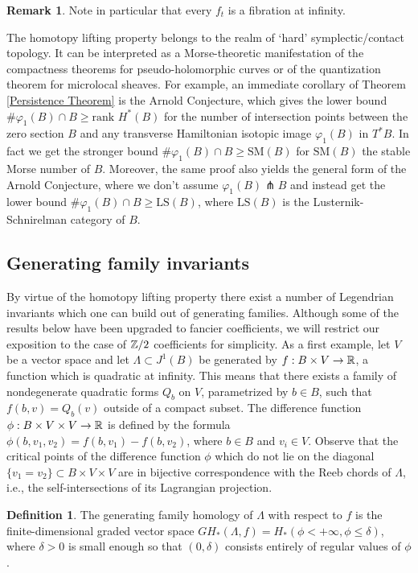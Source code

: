 \documentclass[11pt]{article}
\newcommand{\ie}{i.e.,\xspace}
\numberwithin{equation}{section}\providecommand{\dpl}{\displaystyle}
\theoremstyle{plain}
\theoremstyle{definition}
\newtheorem{definition}[theorem]{Definition}
\newtheorem{remark}[theorem]{Remark}
\begin{document}
\begin{remark} Note in particular that every $f_t$ is a fibration at infinity. \end{remark}

The homotopy lifting property belongs to the realm of `hard' symplectic/contact topology. It can be interpreted as a Morse-theoretic manifestation of the compactness theorems for pseudo-holomorphic curves or of the quantization theorem for microlocal sheaves. For example, an immediate corollary of Theorem \ref{Persistence Theorem} is the Arnold Conjecture, which gives the lower bound $\# \varphi_1(B) \cap B\geq \text{rank }H^*(B)$ for the number of intersection points between the zero section $B$ and any transverse Hamiltonian isotopic image $\varphi_1(B)$ in $T^*B$. In fact we get the stronger bound $\# \varphi_1(B) \cap B\geq \text{SM}(B)$ for $\text{SM}(B)$ the stable Morse number of $B$. Moreover, the same proof also yields the general form of the Arnold Conjecture, where we don't assume $\varphi_1(B) \pitchfork B$ and instead get the lower bound $\# \varphi_1(B) \cap B \geq \text{LS}(B)$, where $\text{LS}(B)$ is the Lusternik-Schnirelman category of $B$.

\subsection{Generating family invariants}

By virtue of the homotopy lifting property there exist a number of Legendrian invariants which one can build out of generating families. Although some of the results below have been upgraded to fancier coefficients, we will restrict our exposition to the case of $\mathbb{Z}/2$ coefficients for simplicity. As a first example, let $V$ be a vector space and let $\Lambda \subset J^1(B)$ be generated by $f:B \times V \to \mathbb{R}$, a function which is quadratic at infinity. This means that there exists a family of nondegenerate quadratic forms $Q_b$ on $V$, parametrized by $b \in B$, such that $f(b,v) = Q_b(v)$ outside of a compact subset. The difference function $\phi: B \times V \times V \to \mathbb{R}$ is defined by the formula $\phi(b,v_1,v_2)=f(b,v_1)-f(b,v_2)$, where $ b \in B$ and $v_i \in V$. Observe that the critical points of the difference function $\phi$ which do not lie on the diagonal $\{ v_1 = v_2 \} \subset B \times V \times V$ are in bijective correspondence with the Reeb chords of $\Lambda$, \ie the self-intersections of its Lagrangian projection.

\begin{definition}
The generating family homology of $\Lambda$ with respect to $f$ is the finite-dimensional graded vector space $GH_*(\Lambda, f) = H_*(\phi<+\infty, \phi \leq \delta)$, where $\delta>0$ is small enough so that $(0, \delta)$ consists entirely of regular values of $\phi$.
\end{definition}
\end{document}
